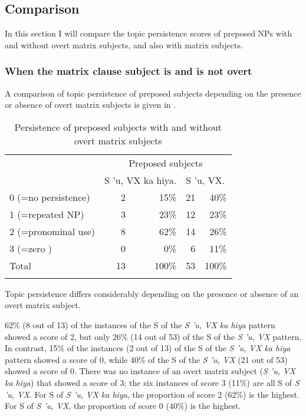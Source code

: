 \documentclass[output=paper
,modfonts
,nonflat]{langsci/langscibook}
\begin{document}
\subsection{\label{s:tsukida:5.3}Comparison}

In this section I will compare the topic persistence scores of preposed NPs with and without overt matrix subjects, and also with matrix subjects.

\subsubsection{\label{s:tsukida:5.3.1}When the matrix clause subject is and is not overt}

A comparison of topic persistence of preposed subjects depending on the presence or absence of overt matrix subjects is given in .

\begin{table}
\begin{tabularx}{\textwidth}{Xrrrr} 
	\lsptoprule
	& \multicolumn{4}{c}{Preposed subjects}\\ \cmidrule{2-5}
	& \multicolumn{2}{l}{S 'u, VX ka hiya.} & \multicolumn{2}{l}{S 'u, VX.}\\
	\midrule
	0 (=no persistence) &  2 &  15\% &  21 &  40\%\\
	1 (=repeated NP) &  3 &  23\% &  12 &  23\%\\
	2 (=pronominal use) &  8 &  62\% &  14 &  26\%\\
	3 (=zero \isi{pronoun}) &  0 &  0\% &  6 &  11\%\\
	\midrule
	Total &  13 &  100\% &  53 &  100\%\\
	\lspbottomrule
\end{tabularx}
	\caption{Persistence of preposed subjects with and without overt  matrix subjects}
	\label{tab:tsukida:11}
\end{table}

Topic persistence differs considerably depending on the presence or absence of an overt matrix subject. 

62\% (8 out of 13) of the instances of the S of the \textit{S 'u, VX ka hiya} pattern showed a score of 2, but only 26\% (14 out of 53) of the S of the \textit{S 'u, VX} pattern. In contrast, 15\% of the instances (2 out of 13) of the S of the \textit{S 'u, VX ka hiya} pattern showed a score of 0, while 40\% of the S of the \textit{S 'u, VX} (21 out of 53) showed a score of 0. There was no instance of an overt matrix subject (\textit{S 'u, VX ka hiya}) that showed a score of 3; the six instances of score 3 (11\%) are all S of \textit{S 'u, VX}. For S of \textit{S 'u, VX ka hiya}, the proportion of score 2 (62\%) is the highest. For S of \textit{S 'u, VX}, the proportion of score 0 (40\%) is the highest. 
\end{document}
